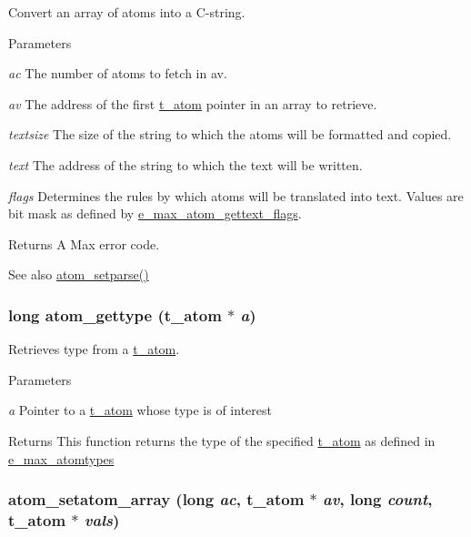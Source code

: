 Convert an array of atoms into a C-\/string. 
\begin{DoxyParams}{Parameters}
\item[{\em ac}]The number of atoms to fetch in av. \item[{\em av}]The address of the first \hyperlink{structt__atom}{t\_\-atom} pointer in an array to retrieve. \item[{\em textsize}]The size of the string to which the atoms will be formatted and copied. \item[{\em text}]The address of the string to which the text will be written. \item[{\em flags}]Determines the rules by which atoms will be translated into text. Values are bit mask as defined by \hyperlink{group__atom_ga42fa1c131691f55dbc781a0be60e3772}{e\_\-max\_\-atom\_\-gettext\_\-flags}.\end{DoxyParams}
\begin{DoxyReturn}{Returns}
A Max error code. 
\end{DoxyReturn}
\begin{DoxySeeAlso}{See also}
\hyperlink{group__atom_ga55938aedb41a8f3565680cf29169dc70}{atom\_\-setparse()} 
\end{DoxySeeAlso}
\hypertarget{group__atom_ga7959e9b765bf2eb52223587d8282a49e}{
\subsubsection[{atom\_\-gettype}]{\setlength{\rightskip}{0pt plus 5cm}long atom\_\-gettype ({\bf t\_\-atom} $\ast$ {\em a})}}
\label{group__atom_ga7959e9b765bf2eb52223587d8282a49e}


Retrieves type from a \hyperlink{structt__atom}{t\_\-atom}. 
\begin{DoxyParams}{Parameters}
\item[{\em a}]Pointer to a \hyperlink{structt__atom}{t\_\-atom} whose type is of interest \end{DoxyParams}
\begin{DoxyReturn}{Returns}
This function returns the type of the specified \hyperlink{structt__atom}{t\_\-atom} as defined in \hyperlink{group__atom_ga8aa6700e9f00b132eb376db6e39ade47}{e\_\-max\_\-atomtypes} 
\end{DoxyReturn}
\hypertarget{group__atom_ga6d8f3b8d919c155a69d9e6a9c010ec74}{
\subsubsection[{atom\_\-setatom\_\-array}]{ atom\_\-setatom\_\-array (long {\em ac}, \/  {\bf t\_\-atom} $\ast$ {\em av}, \/  long {\em count}, \/  {\bf t\_\-atom} $\ast$ {\em vals})}}
\label{group__atom_ga6d8f3b8d919c155a69d9e6a9c010ec74}


